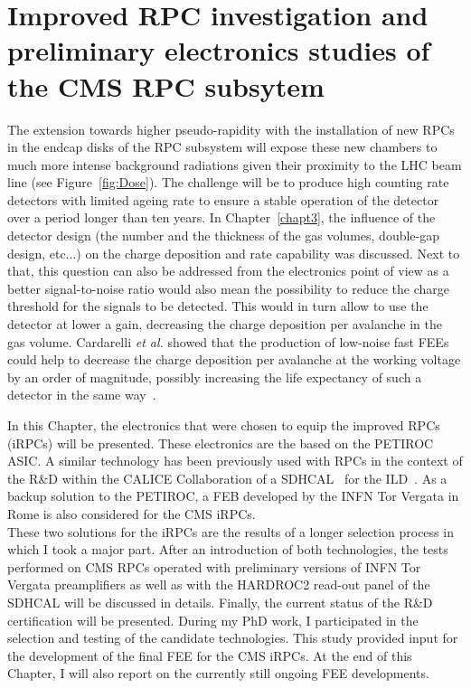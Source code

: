 \renewcommand\evenpagerightmark{{\scshape\small Chapter 6}}
\renewcommand\oddpageleftmark{{\scshape\small Improved RPC investigation and preliminary electronics studies}}

\renewcommand{\bibname}{References}

\hyphenation{}

\chapter[Improved RPC investigation and preliminary electronics studies of the CMS RPC subsytem]%
{Improved RPC investigation and preliminary electronics studies of the CMS RPC subsytem}
\label{chapt6}

	The extension towards higher pseudo-rapidity with the installation of new RPCs in the endcap disks of the RPC subsystem will expose these new chambers to much more intense background radiations given their proximity to the LHC beam line (see Figure~\ref{fig:Dose}). The challenge will be to produce high counting rate detectors with limited ageing rate to ensure a stable operation of the detector over a period longer than ten years. In Chapter~\ref{chapt3}, the influence of the detector design (the number and the thickness of the gas volumes, double-gap design, etc...) on the charge deposition and rate capability was discussed. Next to that, this question can also be addressed from the electronics point of view as a better signal-to-noise ratio would also mean the possibility to reduce the charge threshold for the signals to be detected. This would in turn allow to use the detector at lower a gain, decreasing the charge deposition per avalanche in the gas volume. Cardarelli \textit{et al.} showed that the production of low-noise fast FEEs could help to decrease the charge deposition per avalanche at the working voltage by an order of magnitude, possibly increasing the life expectancy of such a detector in the same way~\cite{CARDARELLI2012}.
	
	In this Chapter, the electronics that were chosen to equip the improved RPCs (iRPCs) will be presented. These electronics are the based on the PETIROC ASIC. A similar technology has been previously used with RPCs in the context of the R\&D within the CALICE Collaboration of a \acf{SDHCAL}~\cite{CALICE2016,ARNAUD2015,STEEN2016} for the \acf{ILD}~\cite{ILDLOI}. As a backup solution to the PETIROC, a FEB developed by the INFN Tor Vergata in Rome is also considered for the CMS iRPCs.\\
	These two solutions for the iRPCs are the results of a longer selection process in which I took a major part. After an introduction of both technologies, the tests performed on CMS RPCs operated with preliminary versions of INFN Tor Vergata preamplifiers as well as with the HARDROC2 read-out panel of the SDHCAL will be discussed in details. Finally, the current status of the R\&D certification will be presented. During my PhD work, I participated in the selection and testing of the candidate technologies. This study provided input for the development of the final FEE for the CMS iRPCs. At the end of this Chapter, I will also report on the currently still ongoing FEE developments.

